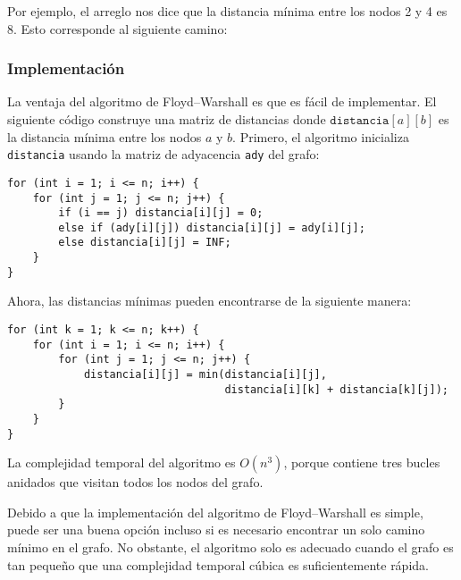 \newpage
Por ejemplo, el arreglo nos dice que la distancia mínima entre
los nodos 2 y 4 es 8. Esto corresponde al siguiente camino:

\begin{center}
\end{center}

\subsubsection{Implementación}

La ventaja del algoritmo de Floyd--Warshall es que es fácil de
implementar. El siguiente código construye una matriz de distancias
donde $\texttt{distancia}[a][b]$ es la distancia mínima entre los
nodos $a$ y $b$. Primero, el algoritmo inicializa \texttt{distancia}
usando la matriz de adyacencia \texttt{ady} del grafo:

\begin{lstlisting}
for (int i = 1; i <= n; i++) {
    for (int j = 1; j <= n; j++) {
        if (i == j) distancia[i][j] = 0;
        else if (ady[i][j]) distancia[i][j] = ady[i][j];
        else distancia[i][j] = INF;
    }
}
\end{lstlisting}
Ahora, las distancias mínimas pueden encontrarse de la siguiente manera:
\begin{lstlisting}
for (int k = 1; k <= n; k++) {
    for (int i = 1; i <= n; i++) {
        for (int j = 1; j <= n; j++) {
            distancia[i][j] = min(distancia[i][j],
                                  distancia[i][k] + distancia[k][j]);
        }
    }
}
\end{lstlisting}

La complejidad temporal del algoritmo es $O(n^3)$, porque contiene
tres bucles anidados que visitan todos los nodos del grafo.

Debido a que la implementación del algoritmo de Floyd--Warshall
es simple, puede ser una buena opción incluso si es necesario
encontrar un solo camino mínimo en el grafo. No obstante,
el algoritmo solo es adecuado cuando el grafo es tan pequeño
que una complejidad temporal cúbica es suficientemente rápida.